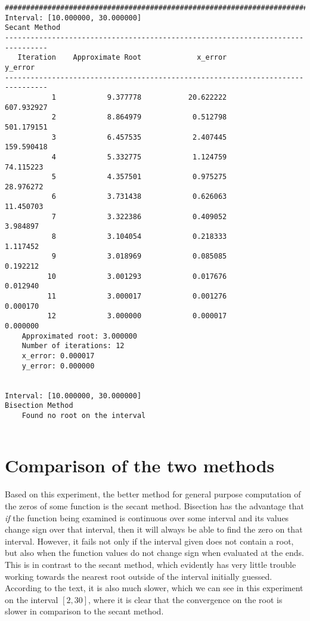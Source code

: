 \documentclass[letterpaper,10pt,titlepage]{article}
\begin{document}
\begin{verbatim}
####################################################################################################
Interval: [10.000000, 30.000000]
Secant Method
--------------------------------------------------------------------------------
   Iteration    Approximate Root             x_error             y_error
--------------------------------------------------------------------------------
           1            9.377778           20.622222          607.932927
           2            8.864979            0.512798          501.179151
           3            6.457535            2.407445          159.590418
           4            5.332775            1.124759           74.115223
           5            4.357501            0.975275           28.976272
           6            3.731438            0.626063           11.450703
           7            3.322386            0.409052            3.984897
           8            3.104054            0.218333            1.117452
           9            3.018969            0.085085            0.192212
          10            3.001293            0.017676            0.012940
          11            3.000017            0.001276            0.000170
          12            3.000000            0.000017            0.000000
	Approximated root: 3.000000
	Number of iterations: 12
	x_error: 0.000017
	y_error: 0.000000


Interval: [10.000000, 30.000000]
Bisection Method
	Found no root on the interval


\end{verbatim}

\section{Comparison of the two methods}
Based on this experiment, the better method for general purpose computation of
the zeros of some function is the secant method. Bisection has the advantage
that \textit{if} the function being examined is continuous over some interval
and its values change sign over that interval, then it will always be able to
find the zero on that interval. However, it fails not only if the interval
given does not contain a root, but also when the function values do not
change sign when evaluated at the ends. This is in contrast to the secant
method, which evidently has very little trouble working towards the nearest root
outside of the interval initially guessed. According to the text, it is also much
slower, which we can see in this experiment on the interval $\left[2,
30\right]$, where it is clear that the convergence on the root is slower in
comparison to the secant method.
\end{document}
